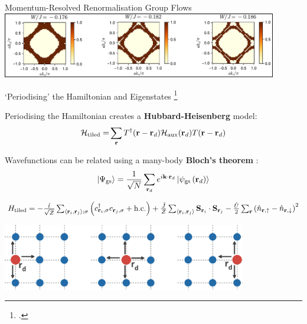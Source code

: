 \documentclass[11pt,aspectratio=169]{beamer}
\newcommand\focus[1]{%
	{\alert{\textbf{#1}}}
}
\begin{document}
\begin{frame}{Momentum-Resolved Renormalisation Group Flows}
\vspace*{\fill}
\includegraphics[width=0.9\textwidth]{scattProb.pdf}
	
\end{frame}

\begin{frame}{`Periodising' the Hamiltonian and Eigenstates}
	\footcite{stoyanova}
	\begin{minipage}{0.45\textwidth}
		Periodising the Hamiltonian creates a \focus{Hubbard-Heisenberg} model:
	\begin{equation*}\begin{aligned}
		\mathcal{H}_\text{tiled} =& \sum_{{\bf r}}T^\dagger({\bf r} - {\bf r}_d)\mathcal{H}_\text{aux}({\bf r}_d)T({\bf r} - {\bf r}_d)\\
	\end{aligned}\end{equation*}
	\end{minipage}
	\hspace{\fill}
	\begin{minipage}{0.45\textwidth}
		Wavefunctions can be related using a many-body \focus{Bloch's theorem}:
	\[\ket{\Psi_\text{gs}} = \frac{1}{\sqrt N}\sum_{{\bf r}_d} e^{i {\bf k}\cdot{\bf r}_d} \ket{\psi_\text{gs}\left({\bf r}_d\right)}\]

	\end{minipage}

	\vspace*{\fill}
	\(H_\text{tiled} = -\frac{\tilde t}{\sqrt{\mathcal{Z}}}\sum_{\left<{\bf r}_i, {\bf r}_j\right>;\sigma}\left(c^\dagger_{{\bf r}_i,\sigma}c_{{\bf r}_j,\sigma} + \text{h.c.}\right) + \frac{\tilde J}{\mathcal{Z}}\sum_{\left< {\bf r}_i, {\bf r}_j\right>}{\bf S}_{{\bf r}_i}\cdot{\bf S}_{{\bf r}_j} - \frac{\tilde U}{2}\sum_{\bf r}\left(\hat n_{{\bf r} , \uparrow} - \hat n_{{\bf r} , \downarrow}\right)^2\)

	\vspace*{15pt}
	\includegraphics[width=0.8\textwidth]{periodisation.pdf}
	
\end{frame}
\end{document}
